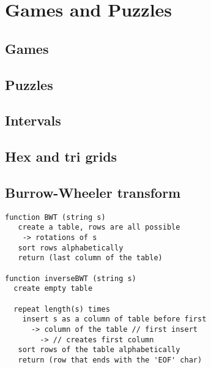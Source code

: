 
\chapter{Games and Puzzles}

	\section{Games}
	
	\section{Puzzles}

	\section{Intervals}

	\section{Hex and tri grids}

	\section{Burrow-Wheeler transform}

\begin{verbatim}
function BWT (string s)
   create a table, rows are all possible
	-> rotations of s
   sort rows alphabetically
   return (last column of the table)
 
function inverseBWT (string s)
  create empty table 
       
  repeat length(s) times
    insert s as a column of table before first
      -> column of the table // first insert
		-> // creates first column
   sort rows of the table alphabetically
   return (row that ends with the 'EOF' char)
\end{verbatim}

